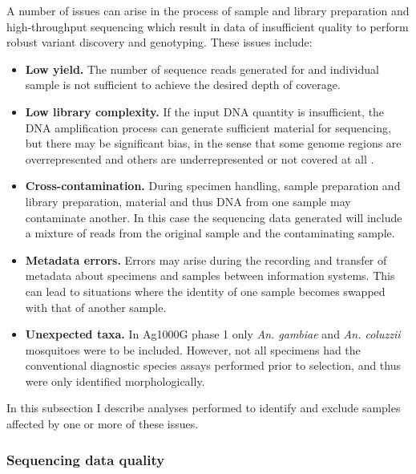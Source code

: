 \documentclass[a4paper,11pt,abstracton,hidelinks]{scrartcl}
\begin{document}
%
A number of issues can arise in the process of sample and library preparation and high-throughput sequencing which result in data of insufficient quality to perform robust variant discovery and genotyping.
%
These issues include:
%
\begin{itemize}
%
\item \textbf{Low yield.} The number of sequence reads generated for and individual sample is not sufficient to achieve the desired depth of coverage.
%
\item \textbf{Low library complexity.} If the input DNA quantity is insufficient, the DNA amplification process can generate sufficient material for sequencing, but there may be significant bias, in the sense that some genome regions are overrepresented and others are underrepresented or not covered at all \citep{Head2018}.
%
\item \textbf{Cross-contamination.} During specimen handling, sample preparation and library preparation, material and thus DNA from one sample may contaminate another. In this case the sequencing data generated will include a mixture of reads from the original sample and the contaminating sample.
%
\item \textbf{Metadata errors.} Errors may arise during the recording and transfer of metadata about specimens and samples between information systems. This can lead to situations where the identity of one sample becomes swapped with that of another sample.
%
\item \textbf{Unexpected taxa.} In Ag1000G phase 1 only \textit{An. gambiae} and \textit{An. coluzzii} mosquitoes were to be included. However, not all specimens had the conventional diagnostic species assays performed prior to selection, and thus were only identified morphologically.
\end{itemize}
%
In this subsection I describe analyses performed to identify and exclude samples affected by one or more of these issues.


\subsubsection{Sequencing data quality}
\end{document}
